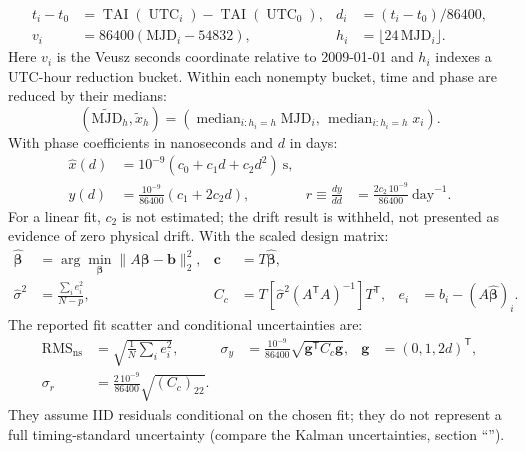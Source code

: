 \documentclass[11pt,a4paper]{article}
\renewcommand{\_}{\usscore\allowbreak}
\begin{document}
\begin{align}
t_i-t_0&=\operatorname{TAI}(\operatorname{UTC}_i)-
          \operatorname{TAI}(\operatorname{UTC}_0),&
d_i&=(t_i-t_0)/86400, \tag{A1}\label{eq:A1}\\
v_i&=86400(\mathrm{MJD}_i-54832),&
h_i&=\lfloor24\,\mathrm{MJD}_i\rfloor. \tag{A2}\label{eq:A2}
\end{align}
Here \(v_i\) is the Veusz seconds coordinate relative to 2009-01-01 and \(h_i\)
indexes a UTC-hour reduction bucket. Within each nonempty bucket, time and
phase are reduced by their medians:
\begin{equation}
(\widetilde{\mathrm{MJD}}_h,\widetilde{x}_h)
=\left(\operatorname{median}_{i:h_i=h}\mathrm{MJD}_i,\,
       \operatorname{median}_{i:h_i=h}x_i\right). \tag{A3}\label{eq:A3}
\end{equation}
With phase coefficients in nanoseconds and \(d\) in days:
\begin{align}
\widehat{x}(d)&=10^{-9}(c_0+c_1d+c_2d^2)\ \mathrm{s}, \tag{A4}\label{eq:A4}\\
y(d)&=\frac{10^{-9}}{86400}(c_1+2c_2d),&
r\equiv\frac{dy}{dd}&=\frac{2c_2\,10^{-9}}{86400}\ \mathrm{day}^{-1}. \tag{A5}\label{eq:A5}
\end{align}
For a linear fit, \(c_2\) is not estimated; the drift result is withheld, not
presented as evidence of zero physical drift. With the scaled design matrix:
\begin{align}
\widehat{\boldsymbol\beta}&=\arg\min_{\boldsymbol\beta}
 \|A\boldsymbol\beta-\mathbf b\|_2^2,&
\mathbf c&=T\widehat{\boldsymbol\beta}, \tag{A6}\label{eq:A6}\\
\widehat{\sigma}^2&=\frac{\sum_i e_i^2}{N-p},&
C_c&=T\left[\widehat{\sigma}^2(A^\mathsf{T}A)^{-1}\right]T^\mathsf{T},
 & e_i&=b_i-(A\widehat{\boldsymbol\beta})_i. \tag{A7}\label{eq:A7}
\end{align}
The reported fit scatter and conditional uncertainties are:
\begin{align}
\mathrm{RMS}_{\mathrm{ns}}&=\sqrt{\frac1N\sum_i e_i^2},&
\sigma_y&=\frac{10^{-9}}{86400}\sqrt{\mathbf g^\mathsf{T}C_c\mathbf g},
 &\mathbf g&=(0,1,2d)^\mathsf{T}, \tag{A8}\label{eq:A8}\\
\sigma_r&=\frac{2\,10^{-9}}{86400}\sqrt{(C_c)_{22}}. \tag{A9}\label{eq:A9}
\end{align}
They assume IID residuals conditional on the chosen fit; they do not represent
a full timing-standard uncertainty (compare the Kalman uncertainties, section ``'').
\clearpage
\end{document}
